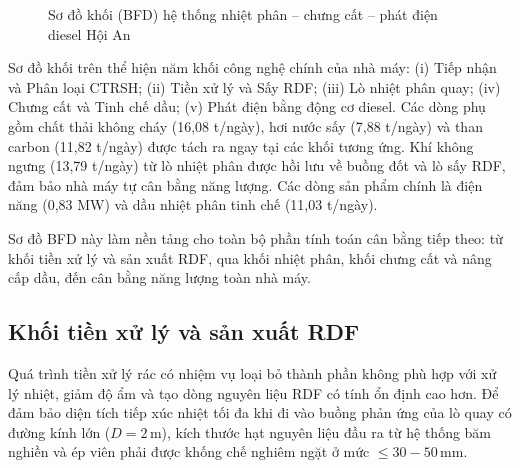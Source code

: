 \documentclass[../main.tex]{subfiles}
\begin{document}
\begin{figure}[H]
{
  } %
  \caption{Sơ đồ khối (BFD) hệ thống nhiệt phân -- chưng cất -- phát điện diesel Hội An}
  \label{fig:bfd-he-thong}
\end{figure}

Sơ đồ khối trên thể hiện năm khối công nghệ chính của nhà máy: (i) Tiếp nhận và Phân loại CTRSH; (ii) Tiền xử lý và Sấy RDF; (iii) Lò nhiệt phân quay; (iv) Chưng cất và Tinh chế dầu; (v) Phát điện bằng động cơ diesel. Các dòng phụ gồm chất thải không cháy (16,08 t/ngày), hơi nước sấy (7,88 t/ngày) và than carbon (11,82 t/ngày) được tách ra ngay tại các khối tương ứng. Khí không ngưng (13,79 t/ngày) từ lò nhiệt phân được hồi lưu về buồng đốt và lò sấy RDF, đảm bảo nhà máy tự cân bằng năng lượng. Các dòng sản phẩm chính là điện năng (0,83 MW) và dầu nhiệt phân tinh chế (11,03 t/ngày).

Sơ đồ BFD này làm nền tảng cho toàn bộ phần tính toán cân bằng tiếp theo: từ khối tiền xử lý và sản xuất RDF, qua khối nhiệt phân, khối chưng cất và nâng cấp dầu, đến cân bằng năng lượng toàn nhà máy.

\subsection{Khối tiền xử lý và sản xuất RDF}
\label{sec:khoi-tien-xu-ly}

Quá trình tiền xử lý rác có nhiệm vụ loại bỏ thành phần không phù hợp với xử lý nhiệt, giảm độ ẩm và tạo dòng nguyên liệu RDF có tính ổn định cao hơn. Để đảm bảo diện tích tiếp xúc nhiệt tối đa khi đi vào buồng phản ứng của lò quay có đường kính lớn ($D=2\,\text{m}$), kích thước hạt nguyên liệu đầu ra từ hệ thống băm nghiền và ép viên phải được khống chế nghiêm ngặt ở mức $\leq 30-50\,\text{mm}$.
\end{document}
